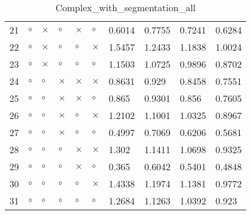 \begin{table}[H]
\begin{tabular}{|P{0.7cm}|P{1.3cm}P{1.3cm}P{1.3cm}P{1.3cm}P{1.3cm}|P{1.1cm}P{1.1cm}P{1.1cm}P{1.1cm}|}
  21 &  $\circ$ & $\times$ &  $\circ$ & $\times$ &     $\circ$ &        0.6014 &          0.7755 &          0.7241 &          0.6284 \\
  22 &  $\circ$ & $\times$ &  $\circ$ &  $\circ$ &    $\times$ &        1.5457 &          1.2433 &          1.1838 &          1.0024 \\
  23 &  $\circ$ & $\times$ &  $\circ$ &  $\circ$ &     $\circ$ &        1.1503 &          1.0725 &          0.9896 &          0.8702 \\
  24 &  $\circ$ &  $\circ$ & $\times$ & $\times$ &    $\times$ &        0.8631 &           0.929 &          0.8458 &          0.7551 \\
  25 &  $\circ$ &  $\circ$ & $\times$ & $\times$ &     $\circ$ &         0.865 &          0.9301 &           0.856 &          0.7605 \\
  26 &  $\circ$ &  $\circ$ & $\times$ &  $\circ$ &    $\times$ &        1.2102 &          1.1001 &          1.0325 &          0.8967 \\
  27 &  $\circ$ &  $\circ$ & $\times$ &  $\circ$ &     $\circ$ &        0.4997 &          0.7069 &          0.6206 &          0.5681 \\
  28 &  $\circ$ &  $\circ$ &  $\circ$ & $\times$ &    $\times$ &         1.302 &          1.1411 &          1.0698 &          0.9325 \\
  29 &  $\circ$ &  $\circ$ &  $\circ$ & $\times$ &     $\circ$ &         0.365 &          0.6042 &          0.5401 &          0.4848 \\
  30 &  $\circ$ &  $\circ$ &  $\circ$ &  $\circ$ &    $\times$ &        1.4338 &          1.1974 &          1.1381 &          0.9772 \\
  31 &  $\circ$ &  $\circ$ &  $\circ$ &  $\circ$ &     $\circ$ &        1.2684 &          1.1263 &          1.0392 &           0.923 \\
\hline
\end{tabular}
\caption{Complex_with_segmentation_all}
\label{tab:}
\end{table}
